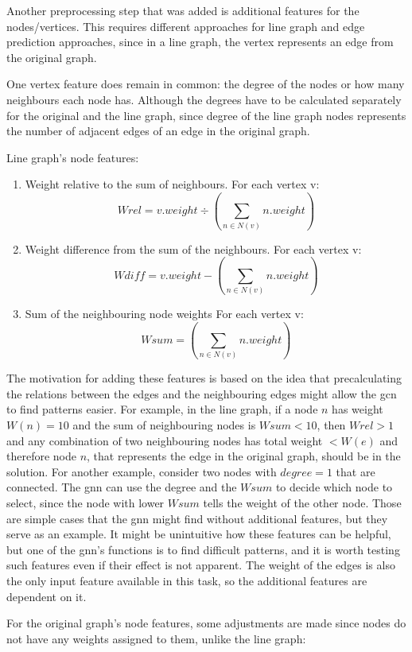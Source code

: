 Another preprocessing step that was added is additional features for the nodes/vertices. This requires different approaches for line graph and edge prediction approaches, since in a line graph, the vertex represents an edge from the original graph.

One vertex feature does remain in common: the degree of the nodes or how many neighbours each node has. Although the degrees have to be calculated separately for the original and the line graph, since degree of the line graph nodes represents the number of adjacent edges of an edge in the original graph.

Line graph's node features:  

\begin{enumerate}
\item Weight relative to the sum of neighbours. For each vertex v:  \[ Wrel = v.weight  \div  (\sum_{n \in N(v)} n.weight) \]
\item Weight difference from the sum of the neighbours. For each vertex v:  \[ Wdiff = v.weight  -  (\sum_{n \in N(v)} n.weight) \]
\item Sum of the neighbouring node weights For each vertex v: \[ Wsum = (\sum_{n \in N(v)} n.weight) \]
\end{enumerate}

The motivation for adding these features is based on the idea that precalculating the relations between the edges and the neighbouring edges might allow the \gls{gcn} to find patterns easier. For example, in the line graph, if a node $n$ has weight $W(n) = 10$ and the sum of neighbouring nodes is $Wsum < 10$, then $Wrel > 1$ and any combination of two neighbouring nodes has total weight $< W(e)$ and therefore node $n$, that represents the edge in the original graph, should be in the solution. For another example, consider two nodes with $degree = 1$ that are connected. The \gls{gnn} can use the degree and the $Wsum$ to decide which node to select, since the node with lower $Wsum$ tells the weight of the other node. Those are simple cases that the \gls{gnn} might find without additional features, but they serve as an example. It might be unintuitive how these features can be helpful, but one of the \gls{gnn}'s functions is to find difficult patterns, and it is worth testing such features even if their effect is not apparent. The weight of the edges is also the only input feature available in this task, so the additional features are dependent on it. 

For the original graph's node features, some adjustments are made since nodes do not have any weights assigned to them, unlike the line graph:

